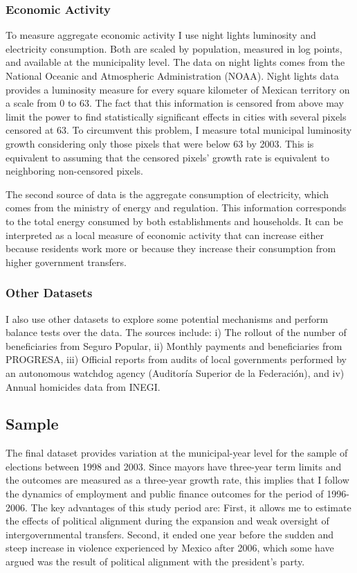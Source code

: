 \documentclass[dv_diss_main.tex]{subfiles}
\begin{document}
\subsubsection{Economic Activity}
To measure aggregate economic activity I use night lights luminosity and electricity consumption. Both are scaled by population, measured in log points, and available at the municipality level. The data on night lights comes from the National Oceanic and Atmospheric Administration (NOAA). Night lights data provides a luminosity measure for every square kilometer of Mexican territory on a scale from 0 to 63. The fact that this information is censored from above may limit the power to find statistically significant effects in cities with several pixels censored at 63. To circumvent this problem, I measure total municipal luminosity growth considering only those pixels that were below 63  by 2003. This is equivalent to assuming that the censored pixels' growth rate is equivalent to neighboring non-censored pixels.

The second source of data is the aggregate consumption of electricity, which comes from the ministry of energy and regulation. This information corresponds to the total energy consumed by both establishments and households. It can be interpreted as a local measure of economic activity that can increase either because residents work more or because they increase their consumption from higher government transfers.


\subsubsection{Other Datasets} I also use other datasets to explore some potential mechanisms and perform balance tests over the data. The sources include: i) The rollout of the number of beneficiaries from Seguro Popular, ii) Monthly payments and beneficiaries from PROGRESA, iii) Official reports from audits of local governments performed by an autonomous watchdog agency (Auditoría Superior de la Federación), and iv) Annual homicides data from INEGI.


\subsection{Sample}

The final dataset  provides variation at the municipal-year level for the sample of elections between 1998 and 2003. Since mayors have three-year term limits and the outcomes are measured as a three-year growth rate, this implies that I follow the dynamics of employment and public finance outcomes for the period of 1996-2006. The key advantages of this study period are: First, it allows me to estimate the effects of political alignment during the expansion and weak oversight of intergovernmental transfers. Second, it ended one year before the sudden and steep increase in violence experienced by Mexico after 2006, which some have argued was the result of political alignment with the president's party.
\end{document}
